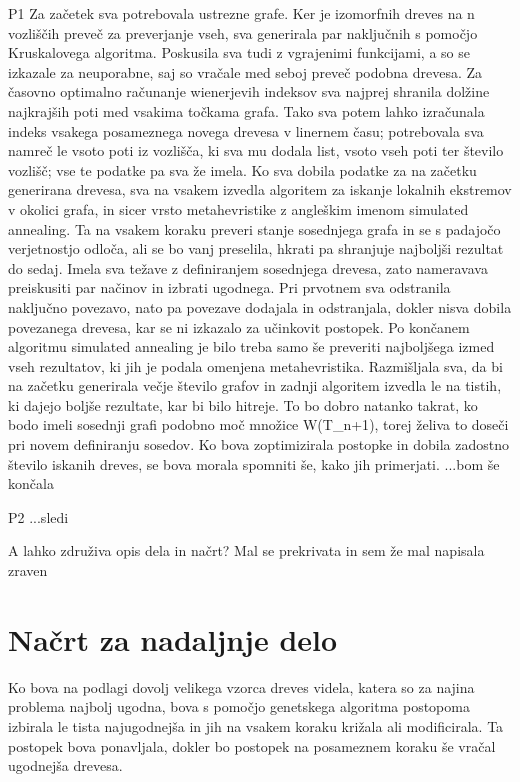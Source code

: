 \documentclass[a4paper, 12 pt]{article}
\begin{document}
P1
Za začetek sva potrebovala ustrezne grafe. Ker je izomorfnih dreves na n vozliščih preveč za preverjanje vseh, sva generirala par naključnih s pomočjo Kruskalovega algoritma. Poskusila sva tudi z vgrajenimi funkcijami, a so se izkazale za neuporabne, saj so vračale med seboj preveč podobna drevesa. Za časovno optimalno računanje wienerjevih indeksov sva najprej shranila dolžine najkrajših poti med vsakima točkama grafa. Tako sva potem lahko izračunala indeks vsakega posameznega novega drevesa v linernem času; potrebovala sva namreč le vsoto poti iz vozlišča, ki sva mu dodala list, vsoto vseh poti ter število vozlišč; vse te podatke pa sva že imela. Ko sva dobila podatke za na začetku generirana drevesa, sva na vsakem izvedla algoritem za iskanje lokalnih ekstremov v okolici grafa, in sicer vrsto metahevristike z angleškim imenom simulated annealing. Ta na vsakem koraku preveri stanje sosednjega grafa in se s padajočo verjetnostjo odloča, ali se bo vanj preselila, hkrati pa shranjuje najboljši rezultat do sedaj. Imela sva težave z definiranjem sosednjega drevesa, zato nameravava preiskusiti par načinov in izbrati ugodnega. Pri prvotnem sva odstranila naključno povezavo, nato pa povezave dodajala in odstranjala, dokler nisva dobila povezanega drevesa, kar se ni izkazalo za učinkovit postopek. Po končanem algoritmu simulated annealing je bilo treba samo še preveriti najboljšega izmed vseh rezultatov, ki jih je podala omenjena metahevristika. Razmišljala sva, da bi na začetku generirala večje število grafov in zadnji algoritem izvedla le na tistih, ki dajejo boljše rezultate, kar bi bilo hitreje. To bo dobro natanko takrat, ko bodo imeli sosednji grafi podobno moč množice W(T_{n+1}), torej želiva to doseči pri novem definiranju sosedov. Ko bova zoptimizirala postopke in dobila zadostno število iskanih dreves, se bova morala spomniti še, kako jih primerjati.
...bom še končala

P2
...sledi


A lahko združiva opis dela in načrt? Mal se prekrivata in sem že mal napisala zraven

\section{Načrt za nadaljnje delo}

Ko bova na podlagi dovolj velikega vzorca dreves videla, katera so za najina problema najbolj ugodna, bova s pomočjo genetskega algoritma postopoma izbirala le tista najugodnejša in jih na vsakem koraku križala ali modificirala. Ta postopek bova ponavljala, dokler bo postopek na posameznem koraku še vračal ugodnejša drevesa.
\end{document}
